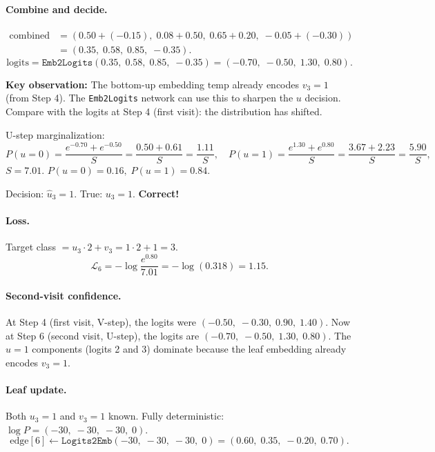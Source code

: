 \documentclass[11pt,a4paper]{article}
\begin{document}
\paragraph{Combine and decide.}
\begin{align*}
\text{combined} &= (0.50 + (-0.15),\; 0.08 + 0.50,\; 0.65 + 0.20,\; -0.05 + (-0.30)) \\
&= (0.35,\; 0.58,\; 0.85,\; -0.35).
\end{align*}
\[
\text{logits} = \texttt{Emb2Logits}(0.35,\; 0.58,\; 0.85,\; -0.35) = (-0.70,\; -0.50,\; 1.30,\; 0.80).
\]

\textbf{Key observation:} The bottom-up embedding $\text{temp}$ already encodes $v_3 = 1$ (from Step 4).  The \texttt{Emb2Logits} network can use this to sharpen the $u$ decision.  Compare with the logits at Step 4 (first visit): the distribution has shifted.

U-step marginalization:
\[
P(u{=}0) = \frac{e^{-0.70} + e^{-0.50}}{S} = \frac{0.50 + 0.61}{S} = \frac{1.11}{S}, \quad
P(u{=}1) = \frac{e^{1.30} + e^{0.80}}{S} = \frac{3.67 + 2.23}{S} = \frac{5.90}{S},
\]
$S = 7.01$.  $P(u{=}0) = 0.16,\; P(u{=}1) = 0.84$.

Decision: $\hat{u}_3 = 1$.  True: $u_3 = 1$.  \textbf{Correct!}

\paragraph{Loss.}
Target class $= u_3 \cdot 2 + v_3 = 1 \cdot 2 + 1 = 3$.
\[
\mathcal{L}_6 = -\log \frac{e^{0.80}}{7.01} = -\log(0.318) = 1.15.
\]

\paragraph{Second-visit confidence.}
At Step 4 (first visit, V-step), the logits were $(-0.50,\; -0.30,\; 0.90,\; 1.40)$.  Now at Step 6 (second visit, U-step), the logits are $(-0.70,\; -0.50,\; 1.30,\; 0.80)$.  The $u{=}1$ components (logits 2 and 3) dominate because the leaf embedding already encodes $v_3 = 1$.

\paragraph{Leaf update.}
Both $u_3 = 1$ and $v_3 = 1$ known.  Fully deterministic: $\log P = (-30,\; -30,\; -30,\; 0)$.
\[
\text{edge}[6] \leftarrow \texttt{Logits2Emb}(-30,\; -30,\; -30,\; 0) = (0.60,\; 0.35,\; -0.20,\; 0.70).
\]
\end{document}
